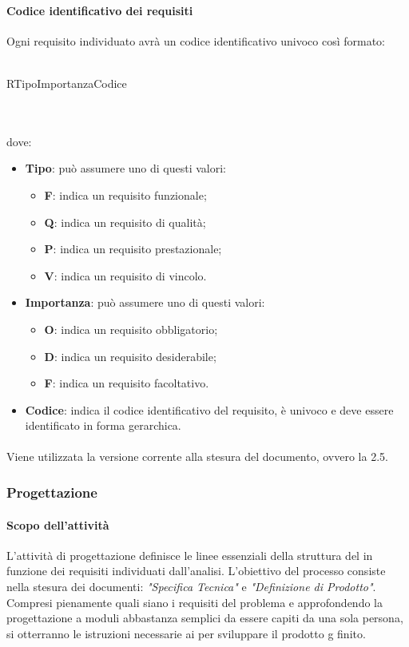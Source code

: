  \paragraph{Codice identificativo dei requisiti}
 Ogni requisito individuato avrà un codice identificativo univoco così formato: \\ \\
 \centerline{R\textbraceleft{}Tipo\textbraceright{}\textbraceleft{}Importanza\textbraceright{}\textbraceleft{}Codice\textbraceright{}}
 \\ \\
 dove:
 \begin{itemize}
 	\item \textbf{Tipo}: può assumere uno di questi valori:
 	\begin{itemize}
 		\item \textbf{F}: indica un requisito funzionale;
 		\item \textbf{Q}: indica un requisito di qualità;
 		\item \textbf{P}: indica un requisito prestazionale;
 		\item \textbf{V}: indica un requisito di vincolo.
 	\end{itemize}
 	\item \textbf{Importanza}: può assumere uno di questi valori:
 	\begin{itemize}
 		\item \textbf{O}: indica un requisito obbligatorio;
 		\item \textbf{D}: indica un requisito desiderabile;
 		\item \textbf{F}: indica un requisito facoltativo.
 	\end{itemize}
 	\item \textbf{Codice}: indica il codice identificativo del requisito, è univoco e deve essere identificato in forma gerarchica.
 \end{itemize}
 \paragraph{}
 Viene utilizzata la versione corrente alla stesura del documento, ovvero la 2.5.
 \subsubsection{Progettazione}
 \paragraph{Scopo dell'attività}
 L'attività di progettazione definisce le linee essenziali della struttura del   in
 funzione dei requisiti individuati dall'analisi. L'obiettivo del processo consiste nella stesura dei
 documenti: \textit{"Specifica Tecnica"} e \textit{"Definizione di Prodotto"}. \\
 Compresi pienamente quali siano i requisiti del problema e approfondendo la progettazione a moduli
 abbastanza semplici da essere capiti da una sola persona, si otterranno le
 istruzioni necessarie ai \PRP{} per sviluppare il prodotto g finito.
